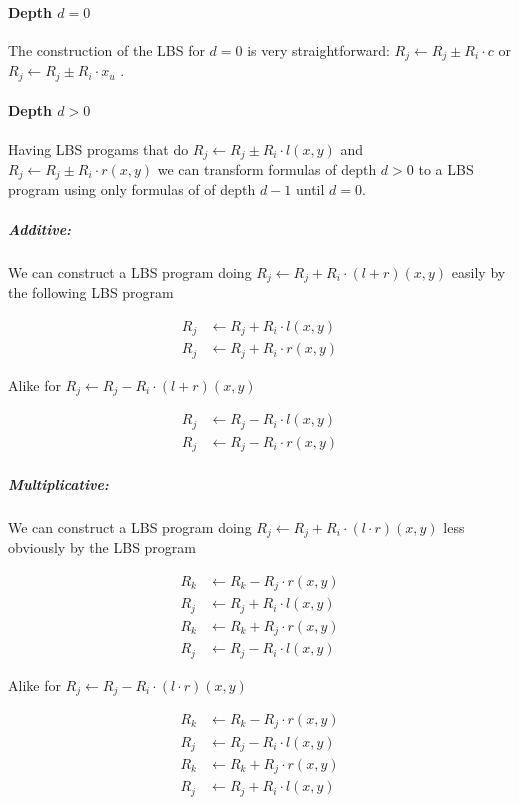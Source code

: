 \documentclass[12pt, a4paper]{article}
\begin{document}
\paragraph{Depth $d = 0$}

The construction of the LBS for $d = 0$ is very straightforward:
$R_j \leftarrow R_j \pm R_i \cdot c$ or $R_j \leftarrow R_j \pm R_i \cdot x_u$ .


\paragraph{Depth $d > 0$}

Having LBS progams that do $R_j \leftarrow R_j \pm R_i \cdot l(x, y)$  and
$R_j \leftarrow R_j \pm R_i \cdot r(x, y)$ we can
transform formulas of depth $d > 0$ to a LBS program using only formulas of
of depth $d - 1$ until $d = 0$.

\subparagraph{Additive:} We can construct a LBS program doing $R_j \leftarrow
R_j + R_i \cdot (l + r)(x, y)$ easily by the following LBS program

\begin{align*}
R_j & \leftarrow R_j + R_i \cdot l(x, y) \\
R_j & \leftarrow R_j + R_i \cdot r(x, y)
\end{align*}

Alike for $R_j \leftarrow R_j - R_i \cdot (l + r)(x, y)$

\begin{align*}
R_j & \leftarrow R_j - R_i \cdot l(x, y) \\
R_j & \leftarrow R_j - R_i \cdot r(x, y)
\end{align*}


\subparagraph{Multiplicative:} We can construct a LBS program doing $R_j
\leftarrow R_j + R_i \cdot (l \cdot r)(x, y)$ less obviously by the LBS program

\begin{align*}
R_k & \leftarrow R_k - R_j \cdot r(x, y) \\
R_j & \leftarrow R_j + R_i \cdot l(x, y) \\
R_k & \leftarrow R_k + R_j \cdot r(x, y) \\
R_j & \leftarrow R_j - R_i \cdot l(x, y)
\end{align*}

Alike for $R_j \leftarrow R_j - R_i \cdot (l \cdot r)(x, y)$

\begin{align*}
R_k & \leftarrow R_k - R_j \cdot r(x, y) \\
R_j & \leftarrow R_j - R_i \cdot l(x, y) \\
R_k & \leftarrow R_k + R_j \cdot r(x, y) \\
R_j & \leftarrow R_j + R_i \cdot l(x, y)
\end{align*}
\end{document}

